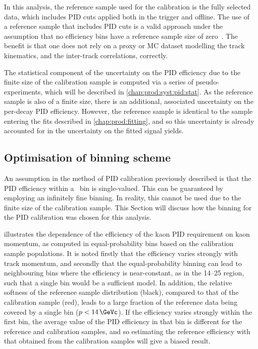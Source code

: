 In this analysis, the reference sample used for the calibration is the fully 
selected data, which includes \ac{PID} cuts applied both in the trigger and 
offline.
The use of a reference sample that includes \ac{PID} cuts is a valid approach 
under the assumption that no efficiency bins have a reference sample size of 
zero~\cite{Anderlini:2202412}.
The benefit is that one does not rely on a proxy or \ac{MC} dataset modelling 
the track kinematics, and the inter-track correlations, correctly.

The statistical component of the uncertainty on the \ac{PID} efficiency due to 
the finite size of the calibration sample is computed via a series of 
pseudo-experiments, which will be described in \cref{chap:prod:syst:pid:stat}.
As the reference sample is also of a finite size, there is an additional, 
associated uncertainty on the per-decay \ac{PID} efficiency.
However, the reference sample is identical to the sample entering the fits 
described in \cref{chap:prod:fitting}, and so this uncertainty is already 
accounted for in the uncertainty on the fitted signal yields.

\subsection{Optimisation of \texorpdfstring{\ptotetanspd}{(p, eta, Nspd)} binning scheme}
\label{chap:prod:effs:pid:binning}

An assumption in the method of \ac{PID} calibration previously described is 
that the \ac{PID} efficiency within a \ptotetanspd\ bin is single-valued.
This can be guaranteed by employing an infinitely fine binning.
In reality, this cannot be used due to the finite size of the calibration 
sample.
This Section will discuss how the binning for the \ac{PID} calibration was 
chosen for this analysis.

 illustrates the 
dependence of the efficiency of the kaon \ac{PID} requirement on kaon momentum, 
as computed in equal-probability bins based on the calibration sample 
populations.
It is noted firstly that the efficiency varies strongly with track momentum, 
and secondly that the equal-probability binning can lead to neighbouring bins 
where the efficiency is near-constant, as in the 14--\SI{25}{\GeVc} region, 
such that a single bin would be a sufficient model.
In addition, the relative softness of the reference sample distribution 
(black), compared to that of the calibration sample (red), leads to a large 
fraction of the reference data being covered by a single bin ($p < 
\SI{14}{\GeVc}$).
If the efficiency varies strongly within the first bin, the average value of 
the \ac{PID} efficiency in that bin is different for the reference and 
calibration samples, and so estimating the reference efficiency with that 
obtained from the calibration samples will give a biased result.

